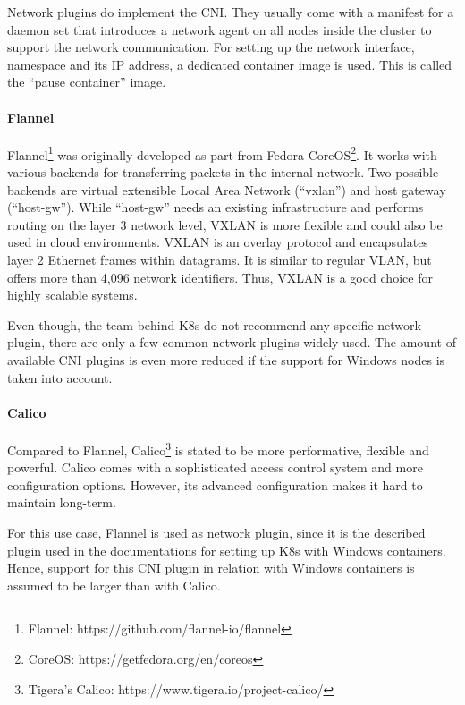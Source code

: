 Network plugins do implement the \ac{CNI}. They usually come with a manifest for a daemon set that introduces a network agent on all nodes inside the cluster to support the network communication.
For setting up the network interface, namespace and its \ac{IP} address, a dedicated container image is used. This is called the \enquote{pause container} image.

\paragraph*{Flannel}
Flannel\footnote{Flannel: https://github.com/flannel-io/flannel} was originally developed as part from Fedora CoreOS\footnote{CoreOS: https://getfedora.org/en/coreos}\cite{SuseRancherCommunity.20230212}. It works with various backends for transferring packets in the internal network. Two possible backends are virtual extensible Local Area Network (\enquote{vxlan}) and host gateway (\enquote{host-gw}). While \enquote{host-gw} needs an existing infrastructure and performs routing on the layer 3 network level, VXLAN is more flexible and could also be used in cloud environments\cite{GitHubFlannel.io.20230212}. VXLAN is an overlay protocol and encapsulates layer 2 Ethernet frames within datagrams\cite{SuseRancherCommunity.20230212}. It is similar to regular VLAN, but offers more than 4,096 network identifiers\cite{SuseRancherCommunity.20230212}. Thus, VXLAN is a good choice for highly scalable systems.

Even though, the team behind \ac{K8s} do not recommend any specific network plugin, there are only a few common network plugins widely used. The amount of available \ac{CNI} plugins is even more reduced if the support for \ac{Windows} nodes is taken into account.

\paragraph*{Calico}
Compared to Flannel, Calico\footnote{Tigera's Calico: https://www.tigera.io/project-calico/} is stated to be more performative, flexible and powerful\cite{SuseRancherCommunity.20230212,Tigera.20230210}. Calico comes with a sophisticated access control system\cite{Tigera.20230210} and more configuration options. However, its advanced configuration makes it hard to maintain long-term.

For this use case, Flannel is used as network plugin, since it is the described plugin used in the documentations for setting up \ac{K8s} with \ac{Windows} containers\cite{GitHubKubernetesSIGWindowsTools.20230213,Kubernetes.20220419}. Hence, support for this \ac{CNI} plugin in relation with \ac{Windows} containers is assumed to be larger than with Calico.


